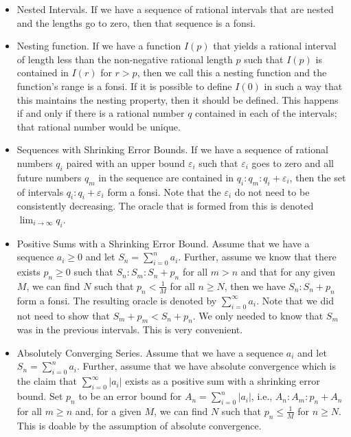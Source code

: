 \documentclass[12pt]{article}
\begin{document}
\begin{itemize}
    \item Nested Intervals. If we have a sequence of rational intervals that are nested and the lengths go to zero, then that sequence is a fonsi.
    
    \item Nesting function. If we have a function $I(p)$ that yields a rational interval of length less than the non-negative rational length $p$ such that $I(p)$ is contained in $I(r)$ for $r>p$, then we call this a nesting function and the function's range is a fonsi. If it is possible to define $I(0)$ in such a way that this maintains the nesting property, then it should be defined. This happens if and only if there is a rational number $q$ contained in each of the intervals; that rational number would be unique. 
    
    \item Sequences with Shrinking Error Bounds. If we have a sequence of rational numbers $q_i$ paired with an upper bound $\varepsilon_i$ such that $\varepsilon_i$ goes to zero and all future numbers $q_m$ in the sequence are contained in $q_i:q_m:q_i+\varepsilon_i$, then the set of intervals $q_i:q_i+\varepsilon_i$ form a fonsi. Note that the $\varepsilon_i$ do not need to be consistently decreasing. The oracle that is formed from this is denoted $\lim_{i \to \infty} q_i $. 
    
    \item Positive Sums with a Shrinking Error Bound. Assume that we have a sequence $a_i\geq 0$ and let $S_n = \sum_{i=0}^n a_i$. Further, assume we know that there exists $p_n \geq 0$ such that $S_n: S_m : S_n + p_n$ for all $m > n$ and that for any given $M$, we can find $N$ such that $p_n < \frac{1}{M}$ for all $n \geq N$, then we have $S_n: S_n + p_n$ form a fonsi. The resulting oracle is denoted by $\sum_{i=0}^\infty a_i$. Note that we did not need to show that $S_m+p_m < S_n + p_n$. We only needed to know that $S_m$ was in the previous intervals. This is very convenient.
    
    \item Absolutely Converging Series. Assume that we have a sequence $a_i$ and let $S_n = \sum_{i=0}^n a_i$. Further, assume that we have absolute convergence which is the claim that $\sum_{i=0}^\infty |a_i|$ exists as a positive sum  with a shrinking error bound. Set $p_n$ to be an error bound for $A_n = \sum_{i=0}^n |a_i|$, i.e., $A_n : A_m : p_n + A_n$ for all $m \geq n$ and, for a given $M$, we can find $N$ such that $p_n \leq \frac{1}{M}$ for $n \geq N$.  This is doable by the assumption of absolute convergence.
    

\end{itemize}
\end{document}
